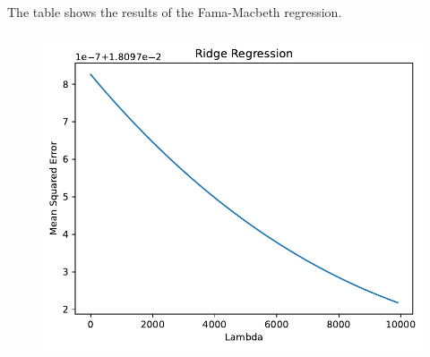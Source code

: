 \documentclass[hidelinks,12pt]{article}
\renewcommand{\thesubsection}{\thesection.\alph{subsection}}
\begin{document}
\section{}
\renewcommand{\thesubsection}{\thesection.\arabic{subsection}}
\renewcommand{\thesubsubsection}{\thesubsection.\alph{subsubsection}}
\setcounter{subsection}{1}
\subsection{}
\subsubsection{}
\begin{table}[htbp]
    \centering
    \caption{The table shows the results of the Fama-Macbeth regression.}
    \resizebox{.9\textwidth}{!}{}
\end{table}
\FloatBarrier
\subsubsection{}
\begin{figure}[htbp]
    \centering
    \includegraphics[width=.95\textwidth]{out/6_2.pdf}
\end{figure}
\FloatBarrier
\end{document}
